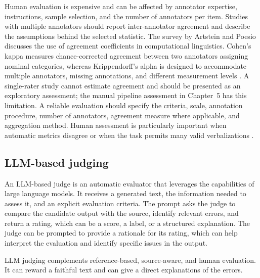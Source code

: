 Human evaluation is expensive and can be affected by annotator expertise,
instructions, sample selection, and the number of annotators per item. Studies
with multiple annotators should report inter-annotator agreement and describe
the assumptions behind the selected statistic. The survey by Artstein and
Poesio~\cite{artstein-poesio-2008-survey} discusses the use of agreement
coefficients in computational linguistics. Cohen's kappa measures
chance-corrected agreement between two annotators assigning nominal categories,
whereas Krippendorff's alpha is designed to accommodate multiple annotators,
missing annotations, and different measurement levels
\cite{cohen1960agreement,krippendorff2004reliability}. A single-rater study
cannot estimate agreement and should be presented as an exploratory assessment;
the manual pipeline assessment in Chapter~5 has this limitation. A reliable
evaluation should specify the criteria, scale, annotation procedure, number of
annotators, agreement measure where applicable, and aggregation method. Human
assessment is particularly important when automatic metrics disagree or when the
task permits many valid verbalizations
\cite{wang-etal-2023-faithful,xiang-etal-2022-asdot}.

\subsection{LLM-based judging}

An LLM-based judge is an automatic evaluator that leverages the capabilities of large language models. It receives a generated text,
the information needed to assess it, and an explicit evaluation criteria. 
The prompt asks the judge to compare the candidate output with the
source, identify relevant errors, and return a rating, which can be a score, a label, or a structured explanation. The judge can be prompted to provide a rationale for its rating, which can help interpret the evaluation and identify specific issues in the output.

LLM judging complements reference-based, source-aware, and human evaluation. It can reward a faithful text and can give a direct explanations of the errors.